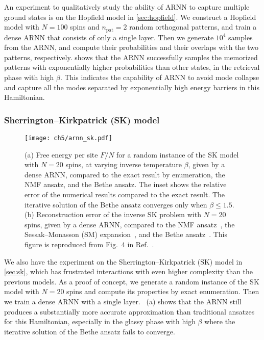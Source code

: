 An experiment to qualitatively study the ability of ARNN to capture multiple ground states is on the Hopfield model in \cref{sec:hopfield}. We construct a Hopfield model with $N = 100$ spins and $n_\text{pat} = 2$ random orthogonal patterns, and train a dense ARNN that consists of only a single layer. Then we generate $10^4$ samples from the ARNN, and compute their probabilities and their overlaps with the two patterns, respectively.  shows that the ARNN successfully samples the memorized patterns with exponentially higher probabilities than other states, in the retrieval phase with high $\beta$. This indicates the capability of ARNN to avoid mode collapse and capture all the modes separated by exponentially high energy barriers in this Hamiltonian.

\subsubsection{Sherrington--Kirkpatrick (SK) model}

\begin{figure}[htb]
\centering
\texttt{[image: ch5/arnn\_sk.pdf]}
\caption[ARNN results of Sherrington--Kirkpatrick (SK) model and inverse SK problem]{
(a) Free energy per site $F / N$ for a random instance of the SK model with $N = 20$ spins, at varying inverse temperature $\beta$, given by a dense ARNN, compared to the exact result by enumeration, the NMF ansatz, and the Bethe ansatz. The inset shows the relative error of the numerical results compared to the exact result.
The iterative solution of the Bethe ansatz converges only when $\beta \le 1.5$. \\
(b) Reconstruction error of the inverse SK problem with $N = 20$ spins, given by a dense ARNN, compared to the NMF ansatz~\cite{roudi2009ising}, the Sessak--Monasson (SM) expansion~\cite{sessak2009small}, and the Bethe ansatz~\cite{ricci2012bethe}.
This figure is reproduced from Fig.~4 in Ref.~\cite{wu2019solving}.
}
\label{fig:arnn-sk}
\end{figure}

We also have the experiment on the Sherrington--Kirkpatrick (SK) model in \cref{sec:sk}, which has frustrated interactions with even higher complexity than the previous models. As a proof of concept, we generate a random instance of the SK model with $N = 20$ spins and compute its properties by exact enumeration. Then we train a dense ARNN with a single layer. ~(a) shows that the ARNN still produces a substantially more accurate approximation than traditional ansatzes for this Hamiltonian, especially in the glassy phase with high $\beta$ where the iterative solution of the Bethe ansatz fails to converge.

